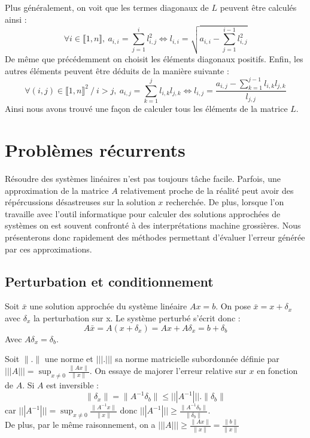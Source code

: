 \documentclass[a4paper, titlepage]{livret}													%
\begin{document}
		Plus généralement, on voit que les termes diagonaux de $L$ peuvent être calculés ainsi :
			\[
				\forall i \in \llbracket 1,n \rrbracket, \ a_{i,i} = \sum_{j = 1}^{i} l_{i,j}^{2} \Leftrightarrow l_{i,i} = \sqrt{a_{i,i} - \sum_{j = 1}^{i-1} l_{i,j}^{2}} 			
			\]
		De même que précédemment on choisit les éléments diagonaux positifs.
		Enfin, les autres éléments peuvent être déduits de la manière suivante :
			\[
				\forall (i,j) \in \llbracket 1,n \rrbracket^{2}\ / \ i > j, \ a_{i,j} = \sum_{k = 1}^{j} l_{i,k}l_{j,k} \Leftrightarrow l_{i, j} = \frac{a_{i,j} - \sum_{k = 1}^{j-1} l_{i,k}l_{j,k}}{l_{j,j}}
			\]
		Ainsi nous avons trouvé une façon de calculer tous les éléments de la matrice $L$.

	\section{Problèmes récurrents}
		Résoudre des systèmes linéaires n'est pas toujours tâche facile. 
		Parfois, une approximation de la matrice $A$ relativement proche de la réalité peut avoir des répércussions désastreuses sur la solution $x$ recherchée. De plus, lorsque l'on travaille avec l'outil informatique pour calculer des solutions approchées de systèmes on est souvent confronté à des interprétations machine grossières.
		Nous présenterons donc rapidement des méthodes permettant d'évaluer l'erreur générée par ces approximations.

		\newpage
		\subsection{Perturbation et conditionnement}
			Soit $\bar{x}$ une solution approchée du système linéaire $Ax = b$.
			On pose $\bar{x} = x + \delta_{x}$ avec $\delta_{x}$ la \og perturbation \fg{} sur x.
			Le système perturbé s'écrit donc :
				\[
					A\bar{x} = A(x + \delta_{x}) = Ax + A\delta_{x} = b + \delta_{b}
				\]
			Avec $A\delta_{x} = \delta_{b}$.

			Soit $\| . \|$ une norme et $||| . |||$ sa norme matricielle subordonnée définie par $||| A ||| = \sup_{x \neq 0}\frac{\|Ax\|}{\|x\|}$.
			On essaye de majorer l'erreur relative sur $x$ en fonction de $A$. 
			Si $A$ est inversible :
				\[
					\| \delta_{x} \| = \| A^{-1}\delta_{b} \| \leq ||| A^{-1} ||| . \| \delta_{b} \|
				\]
			car $||| A^{-1} ||| = \sup_{x \neq 0}\frac{\|A^{-1}x\|}{\|x\|}$ donc $||| A^{-1} ||| \geq \frac{\|A^{-1}\delta_{b}\|}{\| \delta_{b} \|}$.\\
			De plus, par le même raisonnement, on a $||| A ||| \geq \frac{\| Ax \|}{\| x \|} = \frac{\| b \|}{\| x \|}$
			
\end{document}
